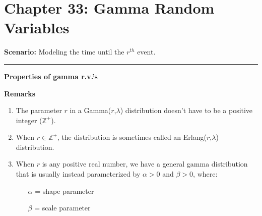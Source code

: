 \documentclass[12pt]{amsart}
\newcommand\gl{\lambda}
\newcommand\ga{\alpha}
\newcommand\gb{\beta}
\begin{document}
\setcounter{section}{33}
{\huge  
\section*{Chapter 33: Gamma Random Variables}
}

{\large %




\vspace{.5cm}

\textbf{Scenario:} Modeling the time until the $r^{th}$ event.

\vspace{.5cm}
\hrule
\vspace{.5cm}


\textbf{Properties of gamma r.v.'s}


\newpage

\textbf{Remarks} 

\begin{enumerate}
\item The parameter $r$ in a Gamma($r$,$\gl$) distribution doesn't have to be a positive integer ($\mathbb{Z}^{+}$).

\item When $r\in \mathbb{Z}^{+}$, the distribution is sometimes called an Erlang($r$,$\gl$) distribution.

\item When $r$ is any positive real number, we have a general gamma distribution that is usually instead parameterized by $\ga >0 $ and $\gb >0 $, where:

	\begin{enumerate}
	\item[$\ga$] = shape parameter
	\item[$\gb$] = scale parameter
	\end{enumerate}
\end{enumerate}

}  %
\end{document}
